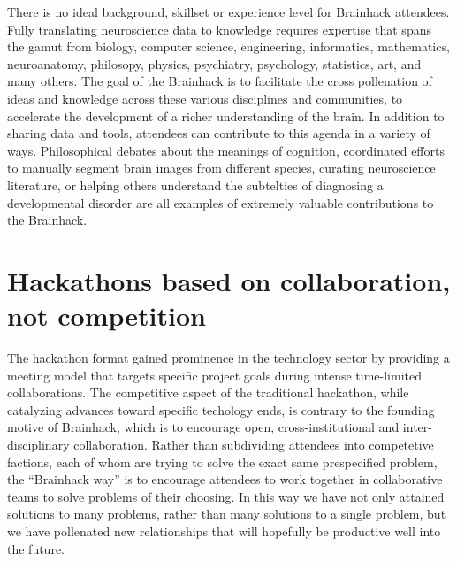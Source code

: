 \documentclass[11pt]{bmc_article_s50}
\begin{document}
There is no ideal background, skillset or experience level for Brainhack
attendees. Fully translating neuroscience data to knowledge requires
expertise that spans the gamut from biology, computer science,
engineering, informatics, mathematics, neuroanatomy, philosopy, physics,
psychiatry, psychology, statistics, art, and many others. The goal of
the Brainhack is to facilitate the cross pollenation of ideas and
knowledge across these various disciplines and communities, to
accelerate the development of a richer understanding of the brain. In
addition to sharing data and tools, attendees can contribute to this
agenda in a variety of ways. Philosophical debates about the meanings of
cognition, coordinated efforts to manually segment brain images from
different species, curating neuroscience literature, or helping others
understand the subtelties of diagnosing a developmental disorder are all
examples of extremely valuable contributions to the Brainhack.

\section{Hackathons based on collaboration, not
competition}\label{hackathons-based-on-collaboration-not-competition}

The hackathon format gained prominence in the technology sector by
providing a meeting model that targets specific project goals during
intense time-limited collaborations. The competitive aspect of the
traditional hackathon, while catalyzing advances toward specific
techology ends, is contrary to the founding motive of Brainhack, which
is to encourage open, cross-institutional and inter-disciplinary
collaboration. Rather than subdividing attendees into competetive
factions, each of whom are trying to solve the exact same prespecified
problem, the ``Brainhack way'' is to encourage attendees to work
together in collaborative teams to solve problems of their choosing. In
this way we have not only attained solutions to many problems, rather
than many solutions to a single problem, but we have pollenated new
relationships that will hopefully be productive well into the future.
\end{document}
